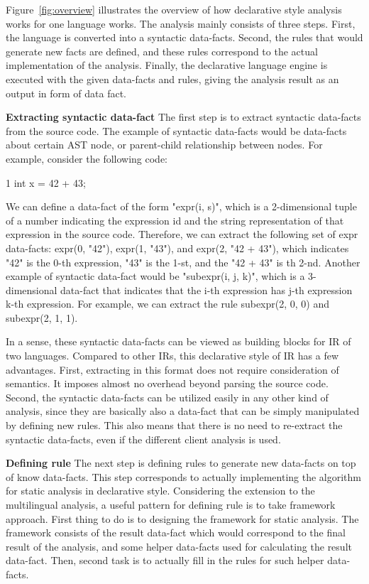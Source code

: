 Figure~\ref{fig:overview} illustrates the overview of how declarative style analysis works for
one language works. The analysis mainly
consists of three steps. First, the language is converted into a syntactic
data-facts. Second, the rules that would generate new facts are defined, and
these rules correspond to the actual implementation of the analysis. Finally, the
declarative language engine is executed with the given data-facts and rules,
giving the analysis result as an output in form of data fact.

\textbf{Extracting syntactic data-fact}
The first step is to extract syntactic data-facts from the source code.
The example of syntactic data-facts would be data-facts about certain
AST node, or parent-child relationship between nodes. For example, consider
the following code:

1 int x = 42 + 43;

We can define a data-fact of the form "expr(i, s)", which is a 2-dimensional
tuple of a number indicating the expression id and the string representation
of that expression in the source code.  Therefore, we can extract the following
set of expr data-facts: expr(0, "42"), expr(1, "43"), and expr(2, "42 + 43"),
which indicates "42" is the 0-th expression, "43" is the 1-st, and the "42 +
43" is th 2-nd.  Another example of syntactic data-fact would be "subexpr(i, j,
k)", which is a 3-dimensional data-fact that indicates that the i-th expression
has j-th expression k-th expression. For example, we can extract the rule
subexpr(2, 0, 0) and subexpr(2, 1, 1).

In a sense, these syntactic data-facts can be viewed as building blocks for IR
of two languages.  Compared to other IRs, this declarative style of IR has a few
advantages. First, extracting in this format does not require consideration of
semantics.  It imposes almost no overhead beyond parsing the source code.
Second, the syntactic data-facts can be utilized easily in any other kind of
analysis, since they are basically also a data-fact that can be simply
manipulated by defining new rules.  This also means that there is no need to
re-extract the syntactic data-facts, even if the different client analysis is
used.

\textbf{Defining rule}
The next step is defining rules to generate new data-facts on top of know
data-facts. This step corresponds to actually implementing the algorithm for
static analysis in declarative style. Considering the extension to the
multilingual analysis, a useful pattern for defining rule is to take framework
approach.  First thing to do is to designing the framework for static analysis.
The framework consists of the result data-fact which would correspond to the
final result of the analysis, and some helper data-facts used for calculating
the result data-fact. Then, second task is to actually fill in the rules for
such helper data-facts.

